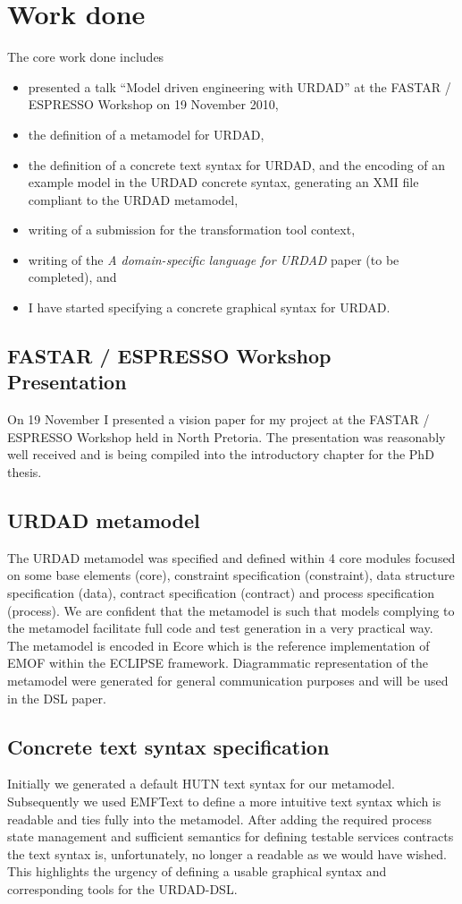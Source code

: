 \section{Work done}

The core work done includes
\begin{itemize}
 \item presented a talk ``Model driven engineering with URDAD'' at the FASTAR / ESPRESSO Workshop on 19 November 2010,
 \item the definition of a metamodel for URDAD,
 \item the definition of a concrete text syntax for URDAD, and the  encoding of an example model in the URDAD concrete syntax, generating an XMI file compliant to the URDAD metamodel,
 \item writing of a submission for the transformation tool context,
 \item writing of the \emph{A domain-specific language for URDAD} paper (to be completed), and
 \item I have started specifying a concrete graphical syntax for URDAD.
\end{itemize}

\subsection{FASTAR / ESPRESSO Workshop Presentation}
On 19 November I presented a vision paper for my project at the FASTAR / ESPRESSO Workshop held in North Pretoria. The presentation was reasonably well received and is being compiled into the introductory chapter for the PhD thesis.

\subsection{URDAD metamodel}
The URDAD metamodel was specified and defined within 4 core modules focused on some base elements (core), constraint specification (constraint), data structure specification (data), contract specification (contract) and process specification (process). We are confident that the metamodel is such that models complying to the metamodel facilitate full code and test generation in a very practical way. The metamodel is encoded in Ecore which is the reference implementation of EMOF within the ECLIPSE framework. Diagrammatic representation of the metamodel were generated for general communication purposes and will be used in the DSL paper.

\subsection{Concrete text syntax specification}
Initially we generated a default HUTN text syntax for our metamodel. Subsequently we used EMFText to define a more intuitive text syntax which is readable and ties fully into the metamodel. After adding the required process state management and sufficient semantics for defining testable services contracts the text syntax is, unfortunately, no longer a readable as we would have wished. This highlights the urgency of defining a usable graphical syntax and corresponding tools for the URDAD-DSL.

